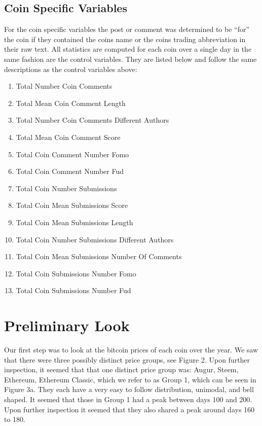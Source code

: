 \documentclass[12pt]{article}
\begin{document}
\subsection{Coin Specific Variables}


\indent \indent For the coin specific variables the post or comment was determined to be ``for'' the coin if they contained the coins name or the coins trading abbreviation in their raw text. All statistics are computed for each coin over a single day in the same fashion are the control variables. They are listed below and follow the same descriptions as the control variables above:
\begin{multicols}{2}
\begin{enumerate}
\item Total Number Coin Comments
\item Total Mean Coin Comment Length
\item Total Number Coin Comments Different Authors
\item Total Mean Coin Comment Score
\item Total Coin Comment Number Fomo
\item Total Coin Comment Number Fud
\item Total Coin Number Submissions
\item Total Coin Mean Submissions Score
\item Total Coin Mean Submissions Length
\item Total Coin Number Submissions Different Authors
\item Total Coin Mean Submissions Number Of Comments
\item Total Coin Submissions Number Fomo
\item Total Coin Submissions Number Fud
\end{enumerate}
\end{multicols}

\section{Preliminary Look}
\indent \indent Our first step was to look at the bitcoin prices of each coin over the year. We saw that there were three possibly distinct price groups, see Figure 2. Upon further inspection, it seemed that that one distinct price group was: Augur, Steem, Ethereum, Ethereum Classic, which we refer to as Group 1, which can be seen in Figure 3a. They each have a very easy to follow distribution, unimodal, and bell shaped. It seemed that those in Group 1 had a peak between days 100 and 200. Upon further inspection it seemed that they also shared a peak around days 160 to 180. 
\end{document}

